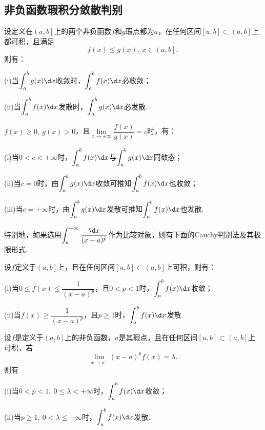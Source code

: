 \subsection{非负函数瑕积分敛散判别}
\begin{theorem}[比较原则]
	设定义在$\left(a,b\right]$上的两个非负函数$f$和$g$瑕点都为$a$，在任何区间$\left[u,b\right]\subset\left(a,b\right]$上都可积，且满足
	$$f(x)\leqslant g(x),\ x\in \left(a,b\right],$$
	则有：

		(i)当$\displaystyle\int_{a}^{b}g(x)\d x$收敛时，$\displaystyle\int_{a}^{b}f(x)\d x$必收敛；
		
		(ii)当$\displaystyle\int_{a}^{b}f(x)\d x$发散时，$\displaystyle\int_{a}^{b}g(x)\d x$必发散.

\end{theorem}
\begin{corollary}[比较原则的极限形式]
	$f(x)\geqslant 0,\ g(x)>0$，且$\lim\limits_{x\to +\infty}\dfrac{f(x)}{g(x)}=c$时，有：
	
	(i)当$0<c<+\infty$时，$\displaystyle\int_{a}^{b}f(x)\d x$与$\displaystyle\int_{a}^{b}g(x)\d x$同敛态；
	
	(ii)当$c=0$时，由$\displaystyle\int_{a}^{b}g(x)\d x$收敛可推知$\displaystyle\int_{a}^{b}f(x)\d x$也收敛；
	
	(iii)当$c=+\infty$时，由$\displaystyle\int_{a}^{b}g(x)\d x$发散可推知$\displaystyle\int_{a}^{b}f(x)\d x$也发散.
\end{corollary}
特别地，如果选用$\displaystyle\int_{a}^{+\infty}\frac{\d x}{(x-a)^p}$作为比较对象，则有下面的{\heiti Cauchy判别法}及其极限形式.
\begin{corollary}[Cauchy判别法]
	设$f$定义于$\left(a,b\right]$上，且在任何区间$\left[u,b\right]\subset\left(a,b\right]$上可积，则有：
	
	(i)当$0\leqslant f(x)\leqslant\dfrac{1}{(x-a)^p}$，且$0<p<1$时，$\displaystyle\int_{a}^{b}f(x)\d x$收敛；
	
	(ii)当$f(x)\geqslant\dfrac{1}{(x-a)^p}$，且$p\geqslant 1$时，$\displaystyle\int_{a}^{b}f(x)\d x$发散.
\end{corollary}
\begin{corollary}[Cauchy判别法的极限形式]
	设$f$是定义于$\left(a,b\right]$上的非负函数，$a$是其瑕点，且在任何区间$\left[u,b\right]\subset\left(a,b\right]$上可积，若
	$$\lim\limits_{x\to a^+}(x-a)^pf(x)=\lambda.$$
	则有
	
	(i)当$0<p<1,\ 0\leqslant\lambda<+\infty$时，$\displaystyle\int_{a}^{b}f(x)\d x$收敛；
	
	(ii)当$p\geqslant 1,\ 0<\lambda\leqslant +\infty$时，$\displaystyle\int_{a}^{b}f(x)\d x$发散.
\end{corollary}
